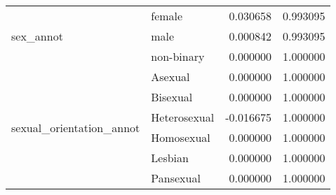 \begin{longtable}{llrr}
\cline{1-4}
\multirow[t]{3}{*}{sex\_annot} & female & 0.030658 & 0.993095 \\
 & male & 0.000842 & 0.993095 \\
 & non-binary & 0.000000 & 1.000000 \\
\cline{1-4}
\multirow[t]{6}{*}{sexual\_orientation\_annot} & Asexual & 0.000000 & 1.000000 \\
 & Bisexual & 0.000000 & 1.000000 \\
 & Heterosexual & -0.016675 & 1.000000 \\
 & Homosexual & 0.000000 & 1.000000 \\
 & Lesbian & 0.000000 & 1.000000 \\
 & Pansexual & 0.000000 & 1.000000 \\
\cline{1-4}
\end{longtable}
